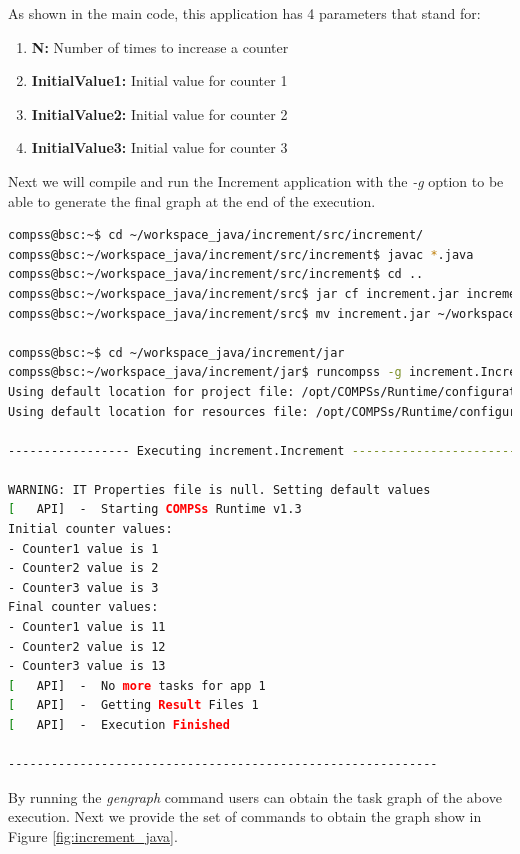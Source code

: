 As shown in the main code, this application has 4 parameters that stand for:

\begin{enumerate}
 \item \textbf{N:} Number of times to increase a counter
 \item \textbf{InitialValue1:} Initial value for counter 1
 \item \textbf{InitialValue2:} Initial value for counter 2
 \item \textbf{InitialValue3:} Initial value for counter 3
\end{enumerate}

Next we will compile and run the Increment application with the \textit{-g} option to be able to generate the final graph at the end of the execution.

\begin{lstlisting}[language=bash]
compss@bsc:~$ cd ~/workspace_java/increment/src/increment/
compss@bsc:~/workspace_java/increment/src/increment$ javac *.java
compss@bsc:~/workspace_java/increment/src/increment$ cd ..
compss@bsc:~/workspace_java/increment/src$ jar cf increment.jar increment
compss@bsc:~/workspace_java/increment/src$ mv increment.jar ~/workspace_java/increment/jar/

compss@bsc:~$ cd ~/workspace_java/increment/jar
compss@bsc:~/workspace_java/increment/jar$ runcompss -g increment.Increment 10 1 2 3
Using default location for project file: /opt/COMPSs/Runtime/configuration/xml/projects/project.xml
Using default location for resources file: /opt/COMPSs/Runtime/configuration/xml/resources/resources.xml

----------------- Executing increment.Increment --------------------------

WARNING: IT Properties file is null. Setting default values
[   API]  -  Starting COMPSs Runtime v1.3
Initial counter values:
- Counter1 value is 1
- Counter2 value is 2
- Counter3 value is 3
Final counter values:
- Counter1 value is 11
- Counter2 value is 12
- Counter3 value is 13
[   API]  -  No more tasks for app 1
[   API]  -  Getting Result Files 1
[   API]  -  Execution Finished

------------------------------------------------------------
\end{lstlisting}

By running the \textit{gengraph} command users can obtain the task graph of the above execution. Next we provide the set of commands to obtain the
graph show in Figure \ref{fig:increment_java}.

